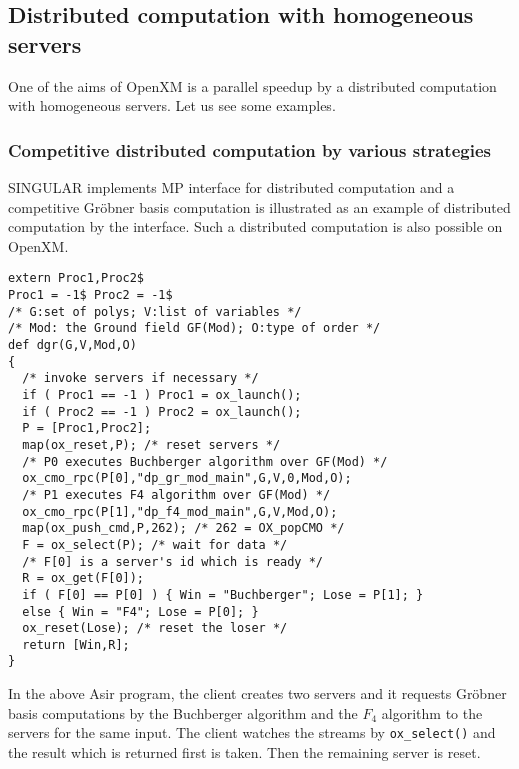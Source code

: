 
\subsection{Distributed computation with homogeneous servers}
\label{section:homog}

One of the aims of OpenXM is a parallel speedup by a distributed computation
with homogeneous servers.  Let us see some examples.

\subsubsection{Competitive distributed computation by various strategies}

SINGULAR \cite{Singular} implements MP interface for distributed
computation and a competitive Gr\"obner basis computation is
illustrated as an example of distributed computation by the interface.
Such a distributed computation is also possible on OpenXM.

\begin{verbatim}
extern Proc1,Proc2$
Proc1 = -1$ Proc2 = -1$
/* G:set of polys; V:list of variables */
/* Mod: the Ground field GF(Mod); O:type of order */
def dgr(G,V,Mod,O)
{
  /* invoke servers if necessary */
  if ( Proc1 == -1 ) Proc1 = ox_launch();
  if ( Proc2 == -1 ) Proc2 = ox_launch();
  P = [Proc1,Proc2];
  map(ox_reset,P); /* reset servers */
  /* P0 executes Buchberger algorithm over GF(Mod) */
  ox_cmo_rpc(P[0],"dp_gr_mod_main",G,V,0,Mod,O);
  /* P1 executes F4 algorithm over GF(Mod) */
  ox_cmo_rpc(P[1],"dp_f4_mod_main",G,V,Mod,O);
  map(ox_push_cmd,P,262); /* 262 = OX_popCMO */
  F = ox_select(P); /* wait for data */
  /* F[0] is a server's id which is ready */
  R = ox_get(F[0]);
  if ( F[0] == P[0] ) { Win = "Buchberger"; Lose = P[1]; }
  else { Win = "F4"; Lose = P[0]; }
  ox_reset(Lose); /* reset the loser */
  return [Win,R];
}
\end{verbatim}
In the above Asir program, the client creates two servers and it requests 
Gr\"obner basis computations by the Buchberger algorithm 
and the $F_4$ algorithm to the servers for the same input.
The client watches the streams by {\tt ox\_select()}
and the result which is returned first is taken. Then the remaining
server is reset.

